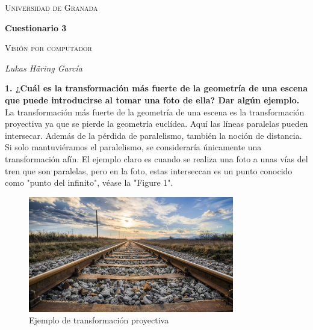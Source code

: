 \documentclass[12pt,a4paper]{article}
\begin{document}
	\begin{titlepage}
		\centering
		{\scshape\LARGE Universidad de Granada \par}
		{\large \date{\specialdate\today}\par}
		\vspace{1cm}
		{\LARGE\bfseries Cuestionario 3\par}
		\vspace{1.5cm}
		{\scshape\large Visión por computador\par}
		\vspace{2cm}
		{\Large\itshape Lukas Häring García\par}
	\end{titlepage}
	
	
	\newpage
	
	\textbf{1. ¿Cuál es la transformación más fuerte de la geometría de una escena que puede introducirse al tomar una foto de ella? Dar algún ejemplo.}
\newline\newline
	La transformación más fuerte de la geometría de una escena es la transformación proyectiva ya que se pierde la geometría euclídea. Aquí las líneas paralelas pueden intersecar. Además de la pérdida de paralelismo, también la noción de distancia. Si solo mantuviéramos el paralelismo, se consideraría únicamente una transformación afín.\newline
	El ejemplo claro es cuando se realiza una foto a unas vías del tren que son paralelas, pero en la foto, estas interseccan es un punto conocido como "punto del infinito", véase la "Figure 1".
	
	\begin{figure}[hbt!]
		\centering
		\includegraphics[width=0.8\textwidth]{../assets/vias.jpg}
		\caption{Ejemplo de transformación proyectiva}
	\end{figure}
	
\end{document}
